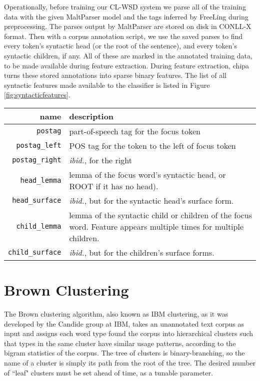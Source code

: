 Operationally, before training our CL-WSD system we parse all of the training
data with the given MaltParser model and the tags inferred by FreeLing during
preprocessing. The parses output by MaltParser are stored on disk in CONLL-X
format. Then with a corpus annotation script, we use the saved parses to find
every token's syntactic head (or the root of the sentence), and every token's
syntactic children, if any. All of these are marked in the annotated training
data, to be made available during feature extraction. During feature extraction,
chipa turns these stored annotations into sparse binary features. The list of
all syntactic features made available to the classifier is listed in Figure
\ref{fig:syntacticfeatures}.

\begin{figure*}
  \begin{centering}
  \begin{tabular}{|r|p{11cm}|}
    \hline
    name          & description  \\
    \hline
    \texttt{postag}    & part-of-speech tag for the focus token \\
    \hline
    \texttt{postag\_left}  & POS tag for the token to the left of focus token \\
    \hline
    \texttt{postag\_right} & \emph{ibid.}, for the right \\
    \hline
    \texttt{head\_lemma} & lemma of the focus word's syntactic head, or ROOT if
    it has no head). \\
    \hline
    \texttt{head\_surface} & \emph{ibid.}, but for the syntactic head's surface
    form. \\
    \hline
    \texttt{child\_lemma} & lemma of the syntactic child or children of the
    focus word. Feature appears multiple times for multiple children. \\
    \hline
    \texttt{child\_surface} & \emph{ibid.}, but for the children's surface
    forms. \\
    \hline
  \end{tabular}
  \end{centering}
  \caption{Additional syntactic features}
  \label{fig:syntacticfeatures}
\end{figure*}

\section{Brown Clustering}
The Brown clustering algorithm\cite{brown1992class}, also known as IBM
clustering, as it was developed by the Candide group at IBM, takes an
unannotated text corpus as input and assigns each word type found the corpus
into hierarchical clusters such that types in the same cluster have similar
usage patterns, according to the bigram statistics of the corpus. The tree of
clusters is binary-branching, so the name of a cluster is simply its path from
the root of the tree.  The desired number of ``leaf" clusters must be set ahead
of time, as a tunable parameter.

